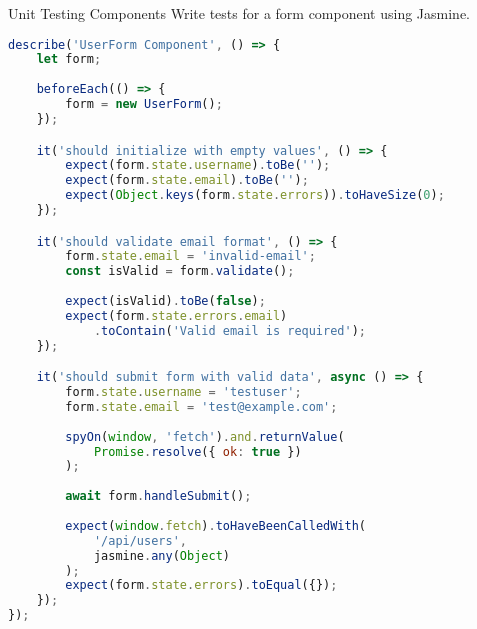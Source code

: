 \begin{example2}{Unit Testing Components}
Write tests for a form component using Jasmine.

\begin{lstlisting}[language=JavaScript, style=basesmol]
describe('UserForm Component', () => {
    let form;
    
    beforeEach(() => {
        form = new UserForm();
    });

    it('should initialize with empty values', () => {
        expect(form.state.username).toBe('');
        expect(form.state.email).toBe('');
        expect(Object.keys(form.state.errors)).toHaveSize(0);
    });

    it('should validate email format', () => {
        form.state.email = 'invalid-email';
        const isValid = form.validate();
        
        expect(isValid).toBe(false);
        expect(form.state.errors.email)
            .toContain('Valid email is required');
    });

    it('should submit form with valid data', async () => {
        form.state.username = 'testuser';
        form.state.email = 'test@example.com';
        
        spyOn(window, 'fetch').and.returnValue(
            Promise.resolve({ ok: true })
        );
        
        await form.handleSubmit();
        
        expect(window.fetch).toHaveBeenCalledWith(
            '/api/users',
            jasmine.any(Object)
        );
        expect(form.state.errors).toEqual({});
    });
});
\end{lstlisting}
\end{example2}